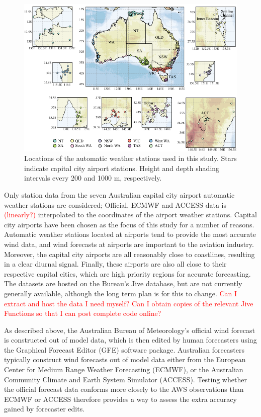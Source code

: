 \documentclass{ametsoc}
\begin{document}
\begin{figure}
\centering
\includegraphics[width=39pc]{map.pdf}
\caption{Locations of the automatic weather stations used in this study. Stars indicate capital city airport stations. Height and depth shading intervals every 200 and 1000 m, respectively.}
\label{Fig:map}
\end{figure}

Only station data from the seven Australian capital city airport automatic weather stations are considered; Official, ECMWF and ACCESS  data is \textcolor{red}{(linearly?)} interpolated to the coordinates of the airport weather stations. Capital city airports have been chosen as the focus of this study for a number of reasons. Automatic weather stations located at airports tend to provide the most accurate wind data, and wind forecasts at airports are important to the aviation industry. Moreover, the capital city airports are all reasonably close to coastlines, resulting in a clear diurnal signal. Finally, these airports are also all close to their respective capital cities, which are high priority regions for accurate forecasting. The datasets are hosted on the Bureau's Jive database, but are not currently generally available, although the long term plan is for this to change. \textcolor{red}{Can I extract and host the data I need myself? Can I obtain copies of the relevant Jive Functions so that I can post complete code online?}

As described above, the Australian Bureau of Meteorology's official wind forecast is constructed out of model data, which is then edited by human forecasters using the Graphical Forecast Editor (GFE) software package. Australian forecasters typically construct wind forecasts out of model data either from the European Center for Medium Range Weather Forecasting (ECMWF), or the Australian Community Climate and Earth System Simulator (ACCESS). Testing whether the official forecast data conforms more closely to the AWS observations than ECMWF or ACCESS therefore provides a way to assess the extra accuracy gained by forecaster edits.
\end{document}

